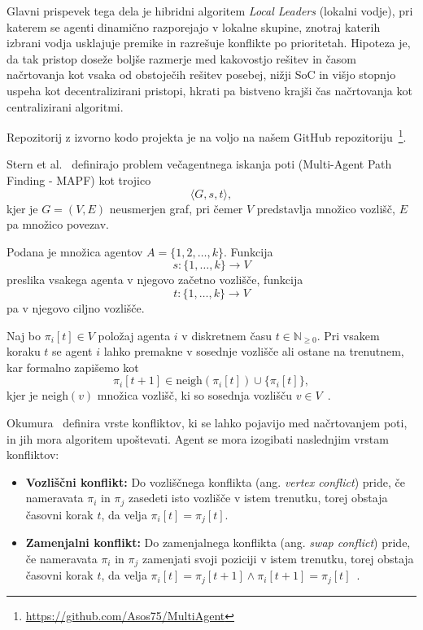 \documentclass[sigconf,nonacm]{acmart}
\begin{document}
Glavni prispevek tega dela je hibridni algoritem \textit{Local Leaders} (lokalni vodje), pri katerem
se agenti dinamično razporejajo v lokalne skupine, znotraj katerih izbrani vodja usklajuje premike
in razrešuje konflikte po prioritetah. Hipoteza je, da tak pristop doseže boljše razmerje med
kakovostjo rešitev in časom načrtovanja kot vsaka od obstoječih rešitev posebej, nižji SoC in
višjo stopnjo uspeha kot decentralizirani pristopi, hkrati pa bistveno krajši čas načrtovanja kot
centralizirani algoritmi.

Repozitorij z izvorno kodo projekta je na voljo na našem GitHub repozitoriju~\footnote{\url{https://github.com/Asos75/MultiAgent}}.

Stern et al.~\cite{stern2019multiagent} definirajo problem večagentnega iskanja poti (Multi-Agent Path Finding - MAPF)
 kot trojico
\[
\langle G, s, t \rangle,
\]
kjer je \( G = (V, E) \) neusmerjen graf, pri čemer \( V \) predstavlja množico vozlišč, \( E \) 
pa množico povezav.

\vspace{0.5em}
\noindent Podana je množica agentov \( A = \{1, 2, \dots, k\} \). Funkcija
\[
s : \{1, \dots, k\} \rightarrow V
\]
preslika vsakega agenta v njegovo začetno vozlišče, funkcija
\[
t : \{1, \dots, k\} \rightarrow V
\]
pa v njegovo ciljno vozlišče.

\vspace{0.5em}
\noindent Naj bo $\pi_i[t]\in V$ položaj agenta $i$ v diskretnem času $t\in\mathbb{N}_{\ge 0}$. Pri vsakem koraku $t$ se agent $i$ lahko 
premakne v sosednje vozlišče ali ostane na trenutnem, kar formalno zapišemo kot
\[\pi_i[t+1]\in\mathrm{neigh}(\pi_i[t])\cup\{\pi_i[t]\},\]
kjer je $\mathrm{neigh}(v)$ množica vozlišč, ki so sosednja vozlišču $v\in V$~\cite{okumura2023lacam}.

\vspace{0.5em}
\noindent 
Okumura~\cite{okumura2023lacam} definira vrste konfliktov, ki se lahko pojavijo med načrtovanjem poti, in jih mora algoritem upoštevati. Agent
se mora izogibati naslednjim vrstam konfliktov:

\begin{itemize}
    \item \textbf{Vozliščni konflikt:} Do vozliščnega konflikta (ang. \textit{vertex conflict}) pride, če nameravata $ \pi_i $ in $ \pi_j $ zasedeti isto 
    vozlišče v istem trenutku, torej obstaja časovni korak $t$, da velja $ \pi_i[t] = \pi_j[t] $.~\cite{stern2019multiagent}
    \item \textbf{Zamenjalni konflikt:} Do zamenjalnega konflikta (ang. \textit{swap conflict}) pride, če nameravata $ \pi_i $ in $ \pi_j $ zamenjati svoji
    poziciji v istem trenutku, torej obstaja časovni korak $t$, da velja $ \pi_i[t] = \pi_j[t+1] \wedge \pi_i[t+1] = \pi_j[t] $~\cite{stern2019multiagent}.
\end{itemize}
\end{document}
